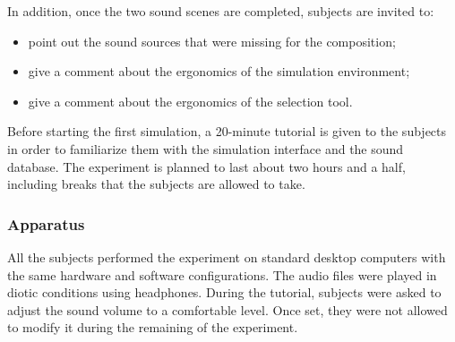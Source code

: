 \documentclass[12pt]{elsarticle}
\begin{document}
%

In addition, once the two sound scenes are completed, subjects are invited to:

\begin{itemize}
\item  point out the sound sources that were missing for the composition;
\item  give a comment about the ergonomics of the simulation environment;
\item  give a comment about the ergonomics of the selection tool.
\end{itemize}


Before starting the first simulation, a 20-minute tutorial is given to the subjects in order to familiarize them with the simulation interface and the sound database. The experiment is planned to last about two hours and a half, including breaks that the subjects are allowed to take.


\subsubsection*{Apparatus}


All the subjects performed the experiment on standard desktop computers with the same hardware and software configurations. The audio files were played in diotic conditions using headphones. During the tutorial, subjects were asked to adjust the sound volume to a comfortable level. Once set, they were not allowed to modify it during the remaining of the experiment.
\end{document}
